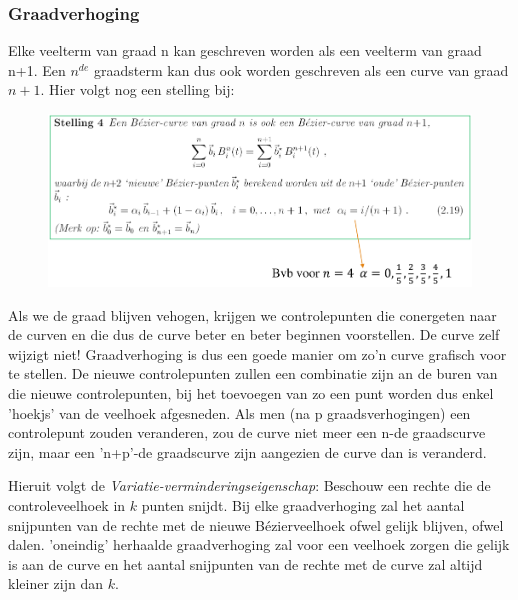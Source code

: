 \documentclass[12pt,a4paper]{article}
\begin{document}
	\subsubsection*{Graadverhoging}
	Elke veelterm van graad n kan geschreven worden als een veelterm van graad n+1. Een $n^{de}$ graadsterm kan dus ook worden geschreven als een curve van graad $n+1$. Hier volgt nog een stelling bij: 
	\begin{figure}[H]
		\centering
		\includegraphics[width=0.8\linewidth]{afbeeldingen/Beziercurven/graadverhoging-stelling}
		\label{fig:graadverhoging-stelling}
	\end{figure}
	Als we de graad blijven vehogen, krijgen we controlepunten die conergeten naar de curven en die dus de curve beter en beter beginnen voorstellen. De curve zelf wijzigt niet! Graadverhoging is dus een goede manier om zo'n curve grafisch voor te stellen. De nieuwe controlepunten zullen een combinatie zijn an de buren van die nieuwe controlepunten, bij het toevoegen van zo een punt worden dus enkel 'hoekjs' van de veelhoek afgesneden. 
	Als men (na p graadsverhogingen) een controlepunt zouden veranderen, zou de curve niet meer een n-de graadscurve zijn, maar een 'n+p'-de graadscurve zijn aangezien de curve dan is veranderd. 
	
	Hieruit volgt de \textit{Variatie-verminderingseigenschap}: Beschouw een rechte die de controleveelhoek in $k$ punten snijdt. Bij elke graadverhoging zal het aantal snijpunten van de rechte met de nieuwe Bézierveelhoek ofwel gelijk blijven, ofwel dalen. 'oneindig' herhaalde graadverhoging zal voor een veelhoek zorgen die gelijk is aan de curve en het aantal snijpunten van de rechte met de curve zal altijd kleiner zijn dan $k$. 
	
\end{document}
